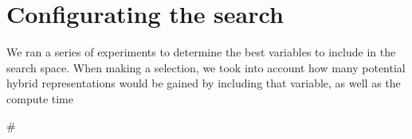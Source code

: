 { %

\section{Configurating the search}



We ran a series of experiments to determine the best variables to include in the search space. 
When making a selection, we took into account how many potential hybrid representations would be gained by including that variable, as well as the compute time 

#

}
